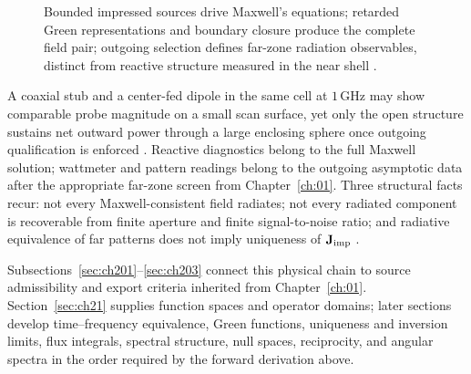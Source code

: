 \begin{figure}[t]
\centering
{}
\caption{Bounded impressed sources drive Maxwell's equations; retarded Green representations and boundary closure produce the complete field pair; outgoing selection defines far-zone radiation observables, distinct from reactive structure measured in the near shell \cite{maxwell1873,stratton1941}.}
\label{fig:ch2.master-spine}
\end{figure}

A coaxial stub and a center-fed dipole in the same cell at $1\,\mathrm{GHz}$ may show comparable probe magnitude on a small scan surface, yet only the open structure sustains net outward power through a large enclosing sphere once outgoing qualification is enforced \cite{stratton1941,harrington2001}. Reactive diagnostics belong to the full Maxwell solution; wattmeter and pattern readings belong to the outgoing asymptotic data after the appropriate far-zone screen from Chapter~\ref{ch:01}. Three structural facts recur: not every Maxwell-consistent field radiates; not every radiated component is recoverable from finite aperture and finite signal-to-noise ratio; and radiative equivalence of far patterns does not imply uniqueness of $\mathbf{J}_{\mathrm{imp}}$ \cite{devaney2004,stratton1941}.

Subsections~\ref{sec:ch201}--\ref{sec:ch203} connect this physical chain to source admissibility and export criteria inherited from Chapter~\ref{ch:01}. Section~\ref{sec:ch21} supplies function spaces and operator domains; later sections develop time--frequency equivalence, Green functions, uniqueness and inversion limits, flux integrals, spectral structure, null spaces, reciprocity, and angular spectra in the order required by the forward derivation above.